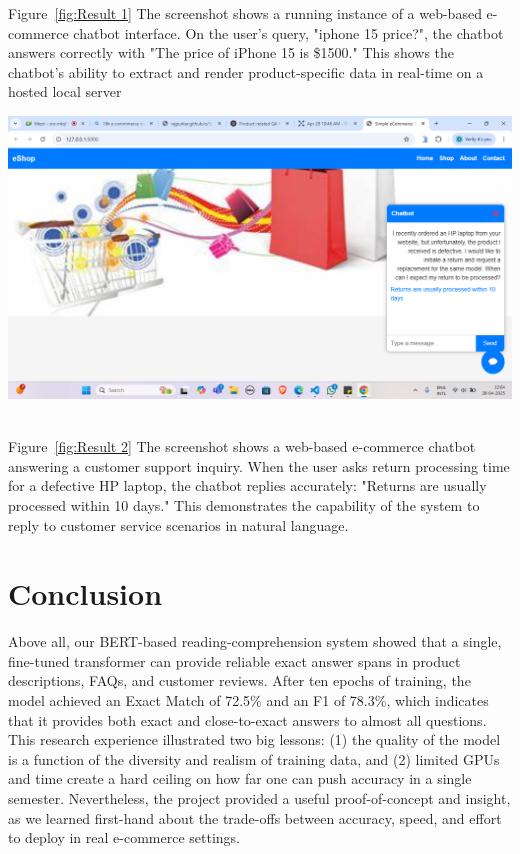 \documentclass[10pt,conference]{IEEEtran}
\begin{document}
Figure~\ref{fig:Result 1} The screenshot shows a running instance of a web-based e-commerce chatbot interface. On the user's query, "iphone 15 price?", the chatbot answers correctly with "The price of iPhone 15 is \$1500." This shows the chatbot's ability to extract and render product-specific data in real-time on a hosted local server\\

\begin{minipage}[t]{0.50\textwidth}   %
  \centering
  \includegraphics[width=\linewidth]{fig5.png}
  \label{fig:Result 2}
\end{minipage} \\

Figure~\ref{fig:Result 2} The screenshot shows a web-based e-commerce chatbot answering a customer support inquiry. When the user asks return processing time for a defective HP laptop, the chatbot replies accurately: "Returns are usually processed within 10 days." This demonstrates the capability of the system to reply to customer service scenarios in natural language. \\ 

\section{Conclusion}
Above all, our BERT-based reading-comprehension system showed that a single, fine-tuned transformer can provide reliable exact answer spans in product descriptions, FAQs, and customer reviews. After ten epochs of training, the model achieved an Exact Match of 72.5\% and an F1 of 78.3\%, which indicates that it provides both exact and close-to-exact answers to almost all questions. This research experience illustrated two big lessons: (1) the quality of the model is a function of the diversity and realism of training data, and (2) limited GPUs and time create a hard ceiling on how far one can push accuracy in a single semester. Nevertheless, the project provided a useful proof-of-concept and insight, as we learned first-hand about the trade-offs between accuracy, speed, and effort to deploy in real e-commerce settings.
\end{document}

